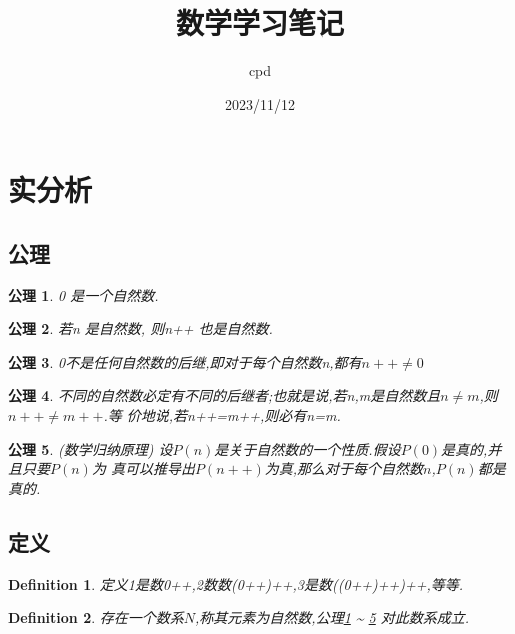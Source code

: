 \documentclass[UTF-8]{ctexart}
\newtheorem{definition}{Definition}[section]
\newtheorem{axiom}{公理}[section]
\begin{document}
\title {数学学习笔记} \author{cpd} \date{2023/11/12}
\maketitle

\tableofcontents
\newpage

\section{实分析}
\subsection{公理}

\begin{axiom}
\label{axiom1}
0 是一个自然数.
\end{axiom}

\begin{axiom}
\label{axiom2}
若n 是自然数, 则n++ 也是自然数.
\end{axiom}

\begin{axiom}
    \label{axiom3}
    0不是任何自然数的后继,即对于每个自然数n,都有$n++ \ne 0$
\end{axiom}
\begin{axiom}
    \label{axiom4}
不同的自然数必定有不同的后继者;也就是说,若n,m是自然数且$n \ne m$,则$n++\ne m++$.等
价地说,若n++=m++,则必有n=m.
\end{axiom}

\begin{axiom}
    \label{axiom5}
(数学归纳原理) 设$P(n)$是关于自然数的一个性质.假设$P(0)$是真的,并且只要$P(n)$为
真可以推导出$P(n++)$为真,那么对于每个自然数$n$,$P(n)$都是真的.
\end{axiom}
\subsection{定义}

\begin{definition}
定义1是数0++,2数数(0++)++,3是数((0++)++)++,等等.
\end{definition}

\begin{definition}
存在一个数系$N$,称其元素为自然数,公理\ref{axiom1} \~{} \ref{axiom5} 对此数系成立.
\end{definition}
\end{document}
